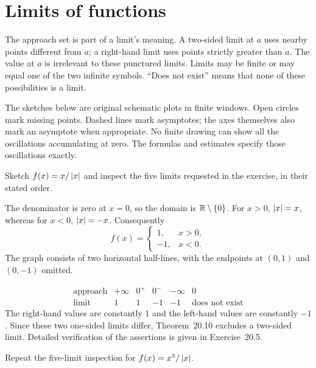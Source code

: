 \section{Limits of functions}
\label{sec:function-limits}

The approach set is part of a limit's meaning. A two-sided limit at
$a$ uses nearby points different from $a$; a right-hand limit uses
points strictly greater than $a$. The value at $a$ is irrelevant to
these punctured limits. Limits may be finite or may equal one of
the two infinite symbols. ``Does not exist'' means that none of
these possibilities is a limit.

The sketches below are original schematic plots in finite windows.
Open circles mark missing points. Dashed lines mark asymptotes;
the axes themselves also mark an asymptote when appropriate.
No finite drawing can show all the oscillations accumulating at zero.
The formulas and estimates specify those oscillations exactly.

\goal Sketch $f(x)=x/\left|x\right|$ and inspect the five limits requested
in the exercise, in their stated order.

The denominator is zero at $x=0$, so the domain is $\mathbb{R}\setminus\{0\}$.
For $x>0$, $\left|x\right|=x$, whereas for $x<0$, $\left|x\right|=-x$.
Consequently
\[
 f(x)=\begin{cases}1,&x>0,\\-1,&x<0.\end{cases}
\]
The graph consists of two horizontal half-lines, with the endpoints
at $(0,1)$ and $(0,-1)$ omitted.
\begin{center}\rossSketchSign\end{center}

\[
\begin{array}{c|ccccc}
 \text{approach}&+\infty&0^+&0^-&-\infty&0\\ \hline
 \text{limit}&1&1&-1&-1&\text{does not exist}
\end{array}
\]
The right-hand values are constantly $1$ and the left-hand values
are constantly $-1$. Since these two one-sided limits differ,
Theorem~20.10 excludes a two-sided limit. Detailed verification
of the assertions is given in Exercise~20.5.

\goal Repeat the five-limit inspection for $f(x)=x^3/\left|x\right|$.

